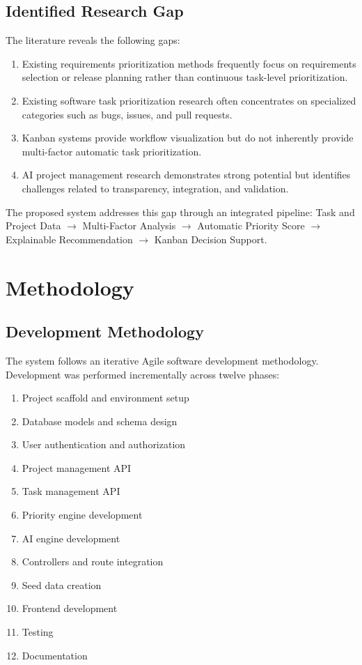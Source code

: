 \documentclass[12pt,a4paper,oneside]{report}
\begin{document}
\section{Identified Research Gap}

The literature reveals the following gaps:
\begin{enumerate}[noitemsep]
  \item Existing requirements prioritization methods frequently focus on requirements selection or release planning rather than continuous task-level prioritization.
  \item Existing software task prioritization research often concentrates on specialized categories such as bugs, issues, and pull requests.
  \item Kanban systems provide workflow visualization but do not inherently provide multi-factor automatic task prioritization.
  \item AI project management research demonstrates strong potential but identifies challenges related to transparency, integration, and validation.
\end{enumerate}

The proposed system addresses this gap through an integrated pipeline: Task and Project Data $\rightarrow$ Multi-Factor Analysis $\rightarrow$ Automatic Priority Score $\rightarrow$ Explainable Recommendation $\rightarrow$ Kanban Decision Support.


\chapter{Methodology}

\section{Development Methodology}

The system follows an iterative Agile software development methodology. Development was performed incrementally across twelve phases:

\begin{enumerate}[noitemsep]
  \item Project scaffold and environment setup
  \item Database models and schema design
  \item User authentication and authorization
  \item Project management API
  \item Task management API
  \item Priority engine development
  \item AI engine development
  \item Controllers and route integration
  \item Seed data creation
  \item Frontend development
  \item Testing
  \item Documentation
\end{enumerate}
\end{document}
